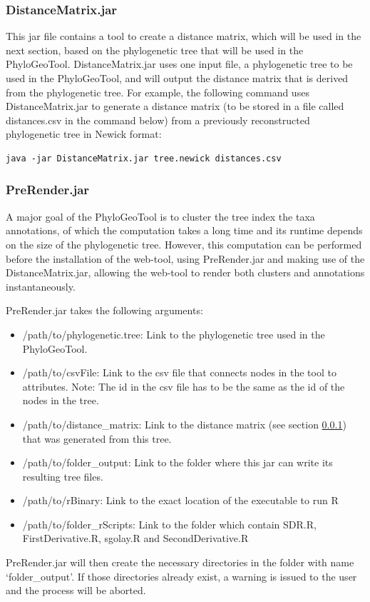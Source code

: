 \documentclass[a4paper, 11pt]{article} %
\begin{document}
\subsubsection{DistanceMatrix.jar}
\label{sec:dm}
This jar file contains a tool to create a distance matrix, which will be used in the next section, based on the phylogenetic tree that will be used in the PhyloGeoTool.
DistanceMatrix.jar uses one input file, a phylogenetic tree to be used in the PhyloGeoTool, and will output the distance matrix that is derived from the phylogenetic tree.
For example, the following command uses DistanceMatrix.jar to generate a distance matrix (to be stored in a file called distances.csv in the command below) from a previously reconstructed phylogenetic tree in Newick format: 
\begin{verbatim}
java -jar DistanceMatrix.jar tree.newick distances.csv
\end{verbatim}


\subsubsection{PreRender.jar}
A major goal of the PhyloGeoTool is to cluster the tree index the taxa annotations, of which the computation takes a long time and its runtime depends on the size of the phylogenetic tree. 
However, this computation can be performed before the installation of the web-tool, using PreRender.jar and making use of the DistanceMatrix.jar, allowing the web-tool to render both clusters and annotations instantaneously.

PreRender.jar takes the following arguments: 
\begin{itemize}
\item /path/to/phylogenetic.tree: Link to the phylogenetic tree used in the PhyloGeoTool.
\item /path/to/csvFile: Link to the csv file that connects nodes in the tool to attributes. Note: The id in the csv file has to be the same as the id of the nodes in the tree.
\item /path/to/distance\_matrix: Link to the distance matrix (see section \ref{sec:dm}) that was generated from this tree.
\item /path/to/folder\_output: Link to the folder where this jar can write its resulting tree files.
\item /path/to/rBinary: Link to the exact location of the executable to run R 
\item /path/to/folder\_rScripts: Link to the folder which contain SDR.R, FirstDerivative.R, sgolay.R and SecondDerivative.R
\end{itemize}
PreRender.jar will then create the necessary directories in the folder with name `folder\_output'.
If those directories already exist, a warning is issued to the user and the process will be aborted.
\end{document}
